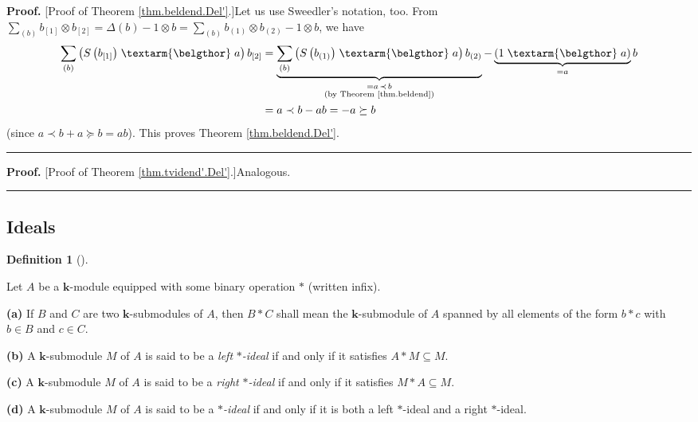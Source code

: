 \documentclass[numbers=enddot,12pt,final,onecolumn,notitlepage]{scrartcl}%
\theoremstyle{definition}
\newtheorem{defi}[theo]{Definition}
\newenvironment{definition}[1][]
{\begin{defi}[#1]\begin{leftbar}}
{\end{leftbar}\end{defi}}
\newenvironment{proof}[1][Proof]{\noindent\textbf{#1.} }{\ \rule{0.5em}{0.5em}}
\newenvironment{verlong}{}{}
\newenvironment{noncompile}{}{}
\newcommand{\bel}{\left. \textarm{\belgthor} \right.}
\let\sumnonlimits\sum
\renewcommand{\sum}{\sumnonlimits\limits}
\begin{document}
\begin{verlong}
\begin{noncompile}
\begin{proof}
[Proof of Theorem \ref{thm.beldend.Del'}.]Let us use Sweedler's notation, too.
From $\sum_{\left(  b\right)  }b_{\left[  1\right]  }\otimes b_{\left[
2\right]  }=\Delta\left(  b\right)  -1\otimes b=\sum_{\left(  b\right)
}b_{\left(  1\right)  }\otimes b_{\left(  2\right)  }-1\otimes b$, we have%
\begin{align*}
\sum_{\left(  b\right)  }\left(  S\left(  b_{\left[  1\right]  }\right)
\bel a\right)  b_{\left[  2\right]  }  &  =\underbrace{\sum_{\left(  b\right)
}\left(  S\left(  b_{\left(  1\right)  }\right)  \bel a\right)  b_{\left(
2\right)  }}_{\substack{=a\left.  \prec\right.  b\\\text{(by Theorem
\ref{thm.beldend})}}}-\underbrace{\left(  1\bel a\right)  }_{=a}b\\
&  =a\left.  \prec\right.  b-ab=-a\left.  \succeq\right.  b
\end{align*}
(since $a\left.  \prec\right.  b+a\left.  \succeq\right.  b=ab$). This proves
Theorem \ref{thm.beldend.Del'}.
\end{proof}

\begin{proof}
[Proof of Theorem \ref{thm.tvidend'.Del'}.]Analogous.
\end{proof}
\end{noncompile}

\subsection{Ideals}

\begin{definition}
Let $A$ be a $\mathbf{k}$-module equipped with some binary operation $\ast$
(written infix).

\textbf{(a)} If $B$ and $C$ are two $\mathbf{k}$-submodules of $A$, then
$B\ast C$ shall mean the $\mathbf{k}$-submodule of $A$ spanned by all elements
of the form $b\ast c$ with $b\in B$ and $c\in C$.

\textbf{(b)} A $\mathbf{k}$-submodule $M$ of $A$ is said to be a \textit{left
}$\ast$\textit{-ideal} if and only if it satisfies $A\ast M\subseteq M$.

\textbf{(c)} A $\mathbf{k}$-submodule $M$ of $A$ is said to be a \textit{right
}$\ast$\textit{-ideal} if and only if it satisfies $M\ast A\subseteq M$.

\textbf{(d)} A $\mathbf{k}$-submodule $M$ of $A$ is said to be a\textit{
}$\ast$\textit{-ideal} if and only if it is both a left $\ast$-ideal and a
right $\ast$-ideal.
\end{definition}


\end{verlong}
\end{document}
